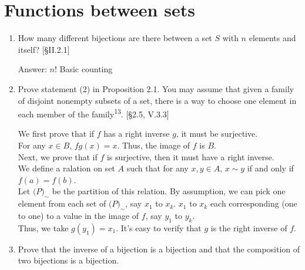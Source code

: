 \section{Functions between sets}
\begin{enumerate}
    \item How many different bijections are there between a set $S$ with $n$ elements and itself? [\S II.2.1]
    \begin{solution}
        Answer: $n!$
        Basic counting
    \end{solution}
    \item Prove statement (2) in Proposition 2.1. You may assume that given a family of disjoint nonempty subsets of a set, there is a way to choose one element in each member of the family\textsuperscript{13}. [\S2.5, V.3.3]
    \begin{solution}
        We first prove that if $f$ has a right inverse $g$, it must be surjective. 
        \\
        For any $x \in B$, $fg(x)=x$. Thus, the image of $f$ is $B$.
        \\
        Next, we prove that if $f$ is surjective, then it must have a right inverse. 
        \\
        We define a ralation on set $A$ such that for any $x,y \in A$, $x\sim y$ if and only if $f(a)=f(b)$. 
        \\
        Let $\mathcal(P)_{\sim}$ be the partition of this relation. By assumption, we can pick one element from each set of $\mathcal(P)_{\sim}$, say $x_1$ to $x_k$. 
        $x_1$ to $x_k$ each corresponding (one to one) to a value in the image of $f$, say $y_1$ to $y_k$.
        \\Thus, we take $g(y_1)=x_1$. 
        It's easy to verify that $g$ is the right inverse of $f$. 
    \end{solution}
    \item Prove that the inverse of a bijection is a bijection and that the composition of two bijections is a bijection.
\end{enumerate}
